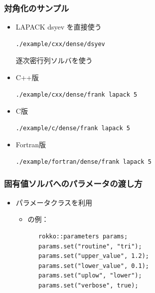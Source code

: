 \begin{frame}[c,fragile]
  \frametitle{対角化のサンプル}
  \begin{itemize}
  \item LAPACK dsyev を直接使う 
\begin{lstlisting}[style=shstyle]
./example/cxx/dense/dsyev
\end{lstlisting}
逐次密行列ソルバを使う
  \item C++版 
\begin{lstlisting}[style=shstyle]
./example/cxx/dense/frank lapack 5
\end{lstlisting}
  \item C版 
\begin{lstlisting}[style=shstyle]
./example/c/dense/frank lapack 5
\end{lstlisting}
  \item Fortran版 
\begin{lstlisting}[style=shstyle]
./example/fortran/dense/frank lapack 5
\end{lstlisting}
  \end{itemize}
\end{frame}

\begin{frame}[c,fragile]
   \frametitle{固有値ソルバへのパラメータの渡し方}
   \begin{itemize}
   \item パラメータクラスを利用
     \begin{itemize}
     \item {}の例：
\begin{lstlisting}
   rokko::parameters params;
   params.set("routine", "tri");
   params.set("upper_value", 1.2);
   params.set("lower_value", 0.1);
   params.set("uplow", "lower");
   params.set("verbose", true);
\end{lstlisting}
\end{itemize}
   \end{itemize}
\end{frame}

